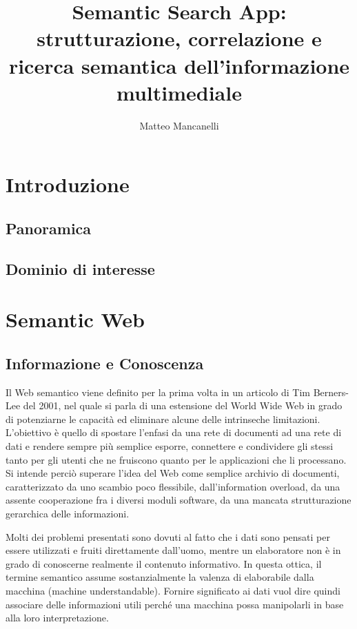 \documentclass[Lau,binding=0.6cm,noexaminfo]{sapthesis}
\title{Semantic Search App: strutturazione, correlazione e ricerca semantica dell'informazione multimediale}
\author{Matteo Mancanelli}
\begin{document}
\frontmatter
\maketitle
\dedication{Dedicato a\\ Morten Tyldum}


\tableofcontents

\mainmatter
\chapter{Introduzione}
\section{Panoramica}
\section{Dominio di interesse}

\chapter{Semantic Web}
\section{Informazione e Conoscenza}

Il Web semantico viene definito per la prima volta in un articolo di Tim Berners-Lee del 2001, nel quale si parla di una estensione del World Wide Web in grado di potenziarne le capacità ed eliminare alcune delle intrinseche limitazioni.
L'obiettivo è quello di spostare l'enfasi da una rete di documenti ad una rete di dati e rendere sempre più semplice esporre, connettere e condividere gli stessi tanto per gli utenti che ne fruiscono quanto per le applicazioni che li processano.
Si intende perciò superare l'idea del Web come semplice archivio di documenti, caratterizzato da uno scambio poco flessibile, dall'information overload, da una assente cooperazione fra i diversi moduli software, da una mancata strutturazione gerarchica delle informazioni.\medskip

Molti dei problemi presentati sono dovuti al fatto che i dati sono pensati per essere utilizzati e fruiti direttamente dall'uomo, mentre un elaboratore non è in grado di conoscerne realmente il contenuto informativo. In questa ottica, il termine semantico assume sostanzialmente la valenza di elaborabile dalla macchina (machine understandable).
Fornire significato ai dati vuol dire quindi associare delle informazioni utili perché una macchina possa manipolarli in base alla loro interpretazione.\medskip
\end{document}
